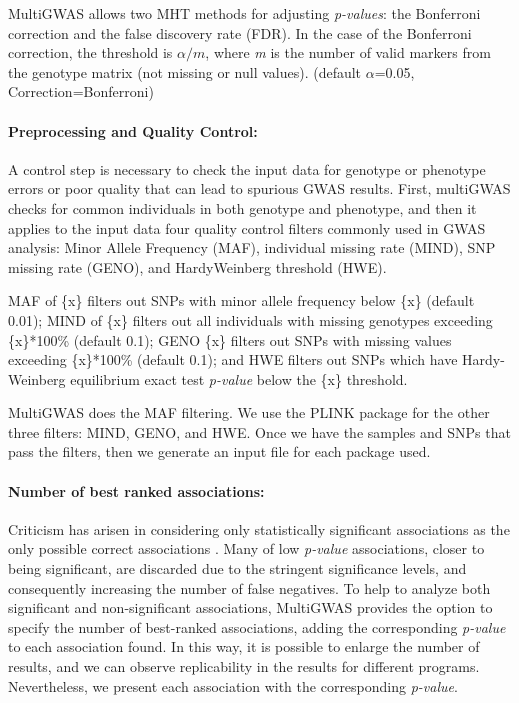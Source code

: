 \documentclass{article}
\begin{document}
MultiGWAS allows two MHT methods for adjusting \emph{p-values}: the Bonferroni correction and the false discovery rate (FDR). In the case of the Bonferroni correction, the threshold is $\alpha/m$, where \emph{m }is the number of valid markers from the genotype matrix (not missing or null values). (default $\alpha$=0.05, Correction=Bonferroni)

\paragraph{Preprocessing and Quality Control:}
A control step is necessary to check the input data for genotype or phenotype errors or poor quality that can lead to spurious GWAS results.  First,  multiGWAS checks for common individuals in both genotype and phenotype, and then it applies to the input data four quality control filters commonly used in GWAS analysis: Minor Allele Frequency (MAF), individual missing rate (MIND), SNP missing rate (GENO), and Hardy\-Weinberg threshold (HWE). 

MAF of \{x\} filters out SNPs with minor allele frequency below \{x\} (default 0.01); MIND of \{x\} filters out all individuals with missing genotypes exceeding \{x\}{*}100\% (default 0.1); GENO \{x\} filters out SNPs with missing values exceeding \{x\}{*}100\% (default 0.1); and HWE filters out SNPs which have Hardy-Weinberg equilibrium exact test \emph{p-value} below the \{x\} threshold.

MultiGWAS does the MAF filtering. We use the PLINK package \cite{Gumpinger2018} for the other three filters: MIND, GENO, and HWE. Once we have the samples and SNPs that pass the filters, then we generate an input file for each package used. 

\paragraph{Number of best ranked associations:}
Criticism has arisen in considering only statistically significant associations as the only possible correct associations \cite{Thomson2011,Kaler2019}. Many of low \emph{p-value} associations, closer to being significant, are discarded due to the stringent significance levels, and consequently increasing the number of false negatives. To help to analyze both significant and non-significant associations, MultiGWAS provides the option to specify the number of best-ranked associations, adding the corresponding  \emph{p-value} to each association found.  In this way, it is possible to enlarge the number of results, and we can observe replicability in the results for different programs. Nevertheless, we present each association with the corresponding \emph{p-value}.%
\end{document}
